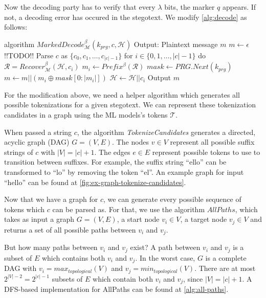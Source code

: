 Now the decoding party has to verify that every $\lambda$ bits, the marker $q$ appears.
If not, a decoding error has occured in the stegotext.
We modify \autoref{alg:decode} as follows:


\begin{Pseudocode}[caption={Marked Decode Algorithm}, label={alg:marked-decode}]
algorithm $MarkedDecode_{\mathcal{M}}^\beta(k_{prg}, c, \mathcal{H})$
	Output: Plaintext message $m$
	$m \leftarrow \epsilon$
	!!TODO!!
	Parse $c$ as $\{ c_0, c_1, \dots, c_{|c|-1} \}$
	for $i \in \{0, 1, \dots, |c|-1 \}$ do
		$\mathcal{R} = Recover_{\mathcal{M}}^\beta(\mathcal{H}, c_i)$
		$m_i \leftarrow Prefix^\beta(\mathcal{R})$
		$mask \leftarrow PRG.Next(k_{prg})$
		$m \leftarrow m || (m_i \oplus mask[0: |m_i|])$
		$\mathcal{H} \leftarrow \mathcal{H}||c_i$
	Output $m$
\end{Pseudocode}

For the modification above, we need a helper algorithm which generates all possible tokenizations for a given stegotext.
We can represent these tokenization candidates in a graph using the ML models's tokens $\mathcal{T}$.

When passed a string $c$, the algorithm \emph{TokenizeCandidates} generates a directed, acyclic graph (DAG) $G = (V, E)$.
The nodes $v \in V$ represent all possible suffix strings of $c$ with $|V| = |c| + 1$.
The edges $e \in E$ represent possible tokens to use to transition between suffixes.
For example, the suffix string ``ello'' can be transformed to ``lo'' by removing the token ``el''.
An example graph for input ``hello'' can be found at \ref{fig:ex-graph-tokenize-candidates}.

Now that we have a graph for $c$, we can generate every possible sequence of tokens which $c$ can be parsed as.
For that, we use the algorithm $AllPaths$, which takes as input a graph $G = (V, E)$, a start node $v_i \in V$, a target node $v_j \in V$ and returns a set of all possible paths between $v_i$ and $v_j$.

But how many paths between $v_i$ and $v_j$ exist? A path between $v_i$ and $v_j$ is a subset of $E$ which contains both $v_i$ and $v_j$.
In the worst case, $G$ is a complete DAG with $v_i = max_{topological}(V)$ and $v_j = min_{topological}(V)$.
There are at most $2^{|V|-2} = 2^{|c|-1}$ subsets of $E$ which contain both $v_i$ and $v_j$, since $|V| = |c|+1$.
A DFS-based implementation for AllPaths can be found at \autoref{alg:all-paths}.

